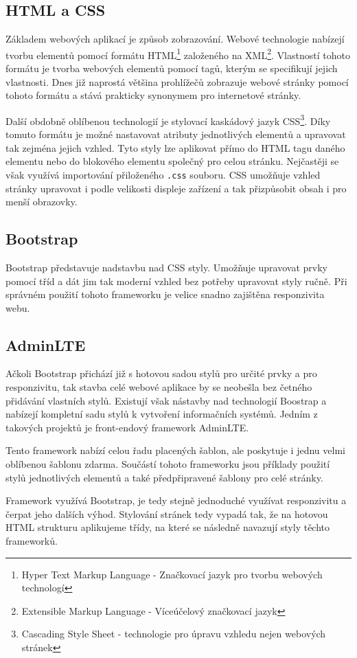 \documentclass[czech,BP]{thesiskiv}
\begin{document}
	\subsection{HTML a CSS}
		\par Základem webových aplikací je způsob zobrazování. Webové technologie nabízejí tvorbu elementů pomocí formátu HTML\footnote{Hyper Text Markup Language - Značkovací jazyk pro tvorbu webových technologí} založeného na XML\footnote{Extensible Markup Language - Víceúčelový značkovací jazyk}. Vlastností tohoto formátu je tvorba webových elementů pomocí tagů, kterým se specifikují jejich vlastnosti. Dnes již naprostá většina prohlížečů zobrazuje webové stránky pomocí tohoto formátu a stává prakticky synonymem pro internetové stránky.
		\par Další obdobně oblíbenou technologií je stylovací kaskádový jazyk CSS\footnote{Cascading Style Sheet - technologie pro úpravu vzhledu nejen webových stránek}. Díky tomuto formátu je možné nastavovat atributy jednotlivých elementů a upravovat tak zejména jejich vzhled. Tyto styly lze aplikovat přímo do HTML tagu daného elementu nebo do blokového elementu společný pro celou stránku. Nejčastěji se však využívá importování přiloženého \texttt{.css} souboru. CSS umožňuje vzhled stránky upravovat i podle velikosti displeje zařízení a tak přizpůsobit obsah i pro menší obrazovky.
	\subsection{Bootstrap}
		\par Bootstrap představuje nadstavbu nad CSS styly. Umožňuje upravovat prvky pomocí tříd a dát jim tak moderní vzhled bez potřeby upravovat styly ručně. Při správném použití tohoto frameworku je velice snadno zajištěna responzivita webu.
	\subsection{AdminLTE}
		Ačkoli Bootstrap přichází již s hotovou sadou stylů pro určité prvky a pro responzivitu, tak stavba celé webové aplikace by se neobešla bez četného přidávání vlastních stylů. Existují však nástavby nad technologií Boostrap a nabízejí kompletní sadu stylů k vytvoření informačních systémů. Jedním z takových projektů je front-endový framework AdminLTE. 
		\par Tento framework nabízí celou řadu placených šablon, ale poskytuje i jednu velmi oblíbenou šablonu zdarma. Součástí tohoto frameworku jsou příklady použití stylů jednotlivých elementů a také předpřipravené šablony pro celé stránky.
		\par Framework využívá Bootstrap, je tedy stejně jednoduché využívat responzivitu a čerpat jeho dalších výhod. Stylování stránek tedy vypadá tak, že na hotovou HTML strukturu aplikujeme třídy, na které se následně navazují styly těchto frameworků. 
\end{document}
